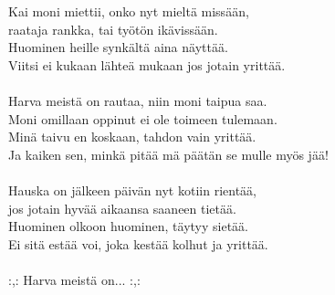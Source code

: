 
        Kai moni miettii, onko nyt mieltä missään, \\
        raataja rankka, tai työtön ikävissään. \\
        Huominen heille synkältä aina näyttää. \\
        Viitsi ei kukaan lähteä mukaan jos jotain yrittää. \\
\hspace{10mm} \\
        Harva meistä on rautaa, niin moni taipua saa. \\
        Moni omillaan oppinut ei ole toimeen tulemaan. \\
        Minä taivu en koskaan, tahdon vain yrittää. \\
        Ja kaiken sen, minkä pitää mä päätän se mulle myös jää! \\
\hspace{10mm} \\
        Hauska on jälkeen päivän nyt kotiin rientää, \\
        jos jotain hyvää aikaansa saaneen tietää. \\
        Huominen olkoon huominen, täytyy sietää. \\
        Ei sitä estää voi, joka kestää kolhut ja yrittää. \\
\hspace{10mm} \\
        :,: Harva meistä on... :,: \\
